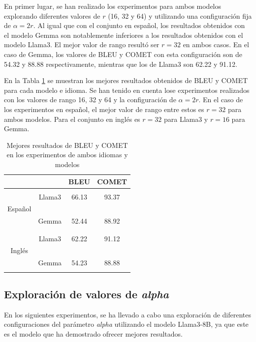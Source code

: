 \documentclass[11pt,spanish,listoffigures,listoftables]{tfgetsinf}
\begin{document}
En primer lugar, se han realizado los experimentos para ambos modelos explorando diferentes valores de $r$ (16, 32 y 64) y utilizando una configuración  fija de $\alpha = 2r$. Al igual que con el conjunto en español, los resultados obtenidos con el modelo Gemma son notablemente inferiores a los resultados obtenidos con el modelo Llama3. El mejor valor de rango resultó ser $r = 32$ en ambos casos. En el caso de Gemma, los valores de BLEU y COMET con esta configuración son de 54.32 y 88.88 respectivamente, mientras que los de Llama3 son 62.22 y 91.12.

En la Tabla \ref{tab:comparacionIdiomas} se muestran los mejores resultados obtenidos de BLEU y COMET para cada modelo e idioma. Se han tenido en cuenta lose experimentos realizados con los valores de rango 16, 32 y 64 y la configuración de $\alpha = 2r$. En el caso de los experimentos en español, el mejor valor de rango entre estos es $r = 32$ para ambos modelos. Para el conjunto en inglés es $r = 32$ para Llama3 y $r = 16$ para Gemma.

\begin{table}[h]
\centering
\begin{tabular}{c  c | c c}

             &  & BLEU & COMET \\ 
\hline
\hline
& & & \\
 & Llama3 &   66.13   &   93.37    \\
Español &  &      &       \\
 & Gemma  &   52.44   &    88.92   \\
& & & \\
\hline
& & &  \\
 & Llama3 & 62.22    &   91.12    \\
Inglés &  &      &       \\
 & Gemma  &  54.23    &    88.88   \\
& & &  \\
\end{tabular}
\caption{Mejores resultados de BLEU y COMET en los experimentos de ambos idiomas y modelos}
\label{tab:comparacionIdiomas}
\end{table}

\subsection{Exploración de valores de \textit{alpha}}

En los siguientes experimentos, se ha llevado a cabo una exploración de diferentes configuraciones del parámetro \textit{alpha} utilizando el modelo Llama3-8B, ya que este es el modelo que ha demostrado ofrecer mejores resultados.
\end{document}
